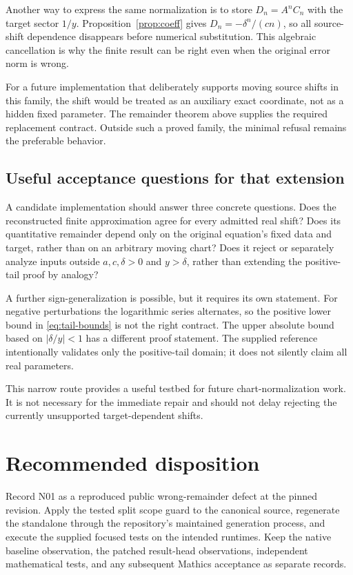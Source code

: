 \documentclass[11pt,letterpaper]{article}
\begin{document}
Another way to express the same normalization is to store $D_n=A^n C_n$ with the target sector $1/y$. Proposition~\ref{prop:coeff} gives $D_n=-\delta^n/(cn)$, so all source-shift dependence disappears before numerical substitution. This algebraic cancellation is why the finite result can be right even when the original error norm is wrong.

For a future implementation that deliberately supports moving source shifts in this family, the shift would be treated as an auxiliary exact coordinate, not as a hidden fixed parameter. The remainder theorem above supplies the required replacement contract. Outside such a proved family, the minimal refusal remains the preferable behavior.

\subsection{Useful acceptance questions for that extension}
A candidate implementation should answer three concrete questions. Does the reconstructed finite approximation agree for every admitted real shift? Does its quantitative remainder depend only on the original equation's fixed data and target, rather than on an arbitrary moving chart? Does it reject or separately analyze inputs outside $a,c,\delta>0$ and $y>\delta$, rather than extending the positive-tail proof by analogy?

A further sign-generalization is possible, but it requires its own statement. For negative perturbations the logarithmic series alternates, so the positive lower bound in \eqref{eq:tail-bounds} is not the right contract. The upper absolute bound based on $|\delta/y|<1$ has a different proof statement. The supplied reference intentionally validates only the positive-tail domain; it does not silently claim all real parameters.

This narrow route provides a useful testbed for future chart-normalization work. It is not necessary for the immediate repair and should not delay rejecting the currently unsupported target-dependent shifts.

\section{Recommended disposition}
Record N01 as a reproduced public wrong-remainder defect at the pinned revision. Apply the tested split scope guard to the canonical source, regenerate the standalone through the repository's maintained generation process, and execute the supplied focused tests on the intended runtimes. Keep the native baseline observation, the patched result-head observations, independent mathematical tests, and any subsequent Mathics acceptance as separate records.
\end{document}
